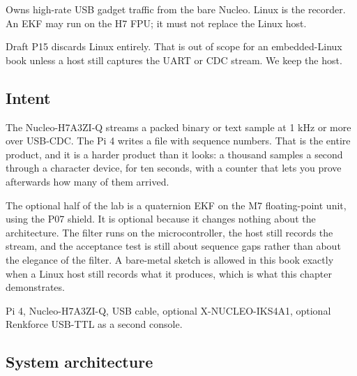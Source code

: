 
\begin{unique}
Owns high-rate USB gadget traffic from the bare Nucleo. Linux is the recorder. An EKF may
run on the H7 FPU; it must not replace the Linux host.
\end{unique}

\begin{blueprint}
Draft P15 discards Linux entirely. That is out of scope for an embedded-Linux book unless
a host still captures the UART or CDC stream. We keep the host.
\end{blueprint}

\subsection*{Intent}

The Nucleo-H7A3ZI-Q streams a packed binary or text sample at 1 kHz or more over USB-CDC.
The Pi 4 writes a file with sequence numbers. That is the entire product, and it is a
harder product than it looks: a thousand samples a second through a character device, for
ten seconds, with a counter that lets you prove afterwards how many of them arrived.

The optional half of the lab is a quaternion EKF on the M7 floating-point unit, using the
P07 shield. It is optional because it changes nothing about the architecture. The filter
runs on the microcontroller, the host still records the stream, and the acceptance test is
still about sequence gaps rather than about the elegance of the filter. A bare-metal sketch
is allowed in this book exactly when a Linux host still records what it produces, which is
what this chapter demonstrates.

\begin{kit}
Pi 4, Nucleo-H7A3ZI-Q, USB cable, optional X-NUCLEO-IKS4A1, optional Renkforce USB-TTL as a
second console.
\end{kit}

\subsection*{System architecture}


